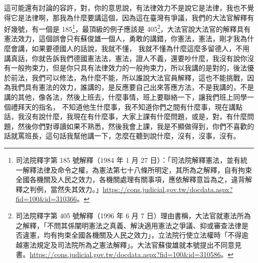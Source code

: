 \hypertarget{w05:cue:356}{}這可能還有討論的容許，對，你的意思說，有法律效力不是說它是法律，我也不覺得它是法律啊，那我為什麼要講這個，因為這在臺灣有爭議，我們的大法官解釋有好幾號，有一個是 185\footnote{司法院釋字第 185 號解釋（1984 年 1 月 27 日）：「司法院解釋憲法，並有統一解釋法律及命令之權，為憲法第七十八條所明定，其所為之解釋，自有拘束全國各機關及人民之效力，各機關處理有關事項，應依解釋意旨為之，違背解釋之判例，當然失其效力。」\url{https://cons.judicial.gov.tw/docdata.aspx?fid=100&id=310366}。}，最頂級的例子應該是 405\footnote{司法院釋字第 405 號解釋（1996 年 6 月 7 日）理由書稱，大法官就憲法所為之解釋，「不問其係闡明憲法之真義、解決適用憲法之爭議、抑或審查法律是否違憲，均有拘束全國各機關及人民之效力」，立法院行使立法權時「不得逾越憲法規定及司法院所為之憲法解釋」。大法官蘇俊雄就本號提出不同意見書。\url{https://cons.judicial.gov.tw/docdata.aspx?fid=100&id=310586}。}，大法官說大法官的解釋具有憲法效力，這個誤會只有蘇俊雄一個人，勇敢的講錯，你憲法，憲法，剛才我為什麼會講，如果要德國人的話說，我就不懂，
\hypertarget{w05:cue:357}{}我就不懂為什麼這麼多留德人，不用講真話，你就告訴我們德國憲法法，憲法，證人不義，還要吵什麼，我沒有說你沒有一般拘束力，但是你只具有法律效力的一般拘束力，所以我講的是對的，後法優於前法，我們可以修法，為什麼不能，所以誰說大法官員解釋，這也不能挑戰，因為我們具有憲法的效力，誰講的，是反應要自己出來答應方法，不是我講的，不是講的其他，像各法，然後上班去，什麼事情，班上要聯絡一下，讓我們班上同學一個禮拜天的指名，
\hypertarget{w05:cue:358}{}不知道他生什麼事，我不知道你們之間有什麼事，現在講點話，我沒有說什麼，我現在有什麼事，大家上課有什麼問題，或是，對，有什麼問題，然後你們對導讀如果不熟悉，然後我會上課，我是不顯做得到，你們不喜歡的話就罵班長，這句話我幫他講一下，怎麼在聽到說什麼，沒有，沒事，沒有。
